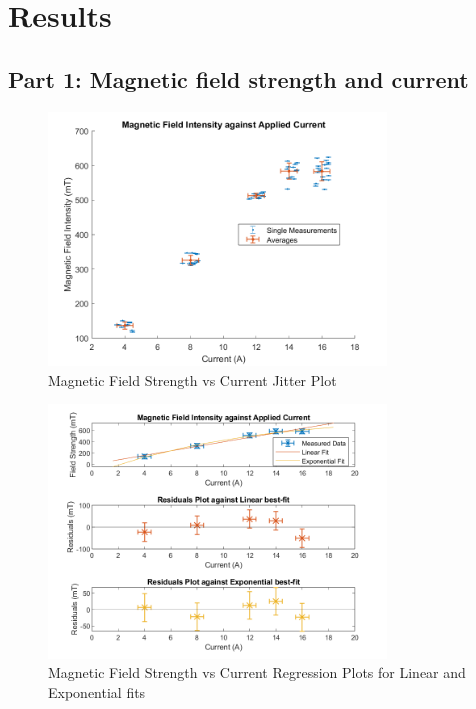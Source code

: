 

\section{Results}

\subsection{Part 1: Magnetic field strength and current}

\begin{figure}
    \centering
    \includegraphics[width=0.8\textwidth]{Results/Figures/Magnetic_Field_vs_Current_jitter.png}
    \caption{Magnetic Field Strength vs Current Jitter Plot}
    \label{fig:magnetic_field_vs_current_jitter}
\end{figure}
\begin{figure}
    \centering
    \includegraphics[width=0.8\textwidth]{Results/Figures/Magnetic_Field_vs_Current.png}
    \caption{Magnetic Field Strength vs Current Regression Plots for Linear and Exponential fits}
    \label{fig:magnetic_field_vs_current}
\end{figure}
